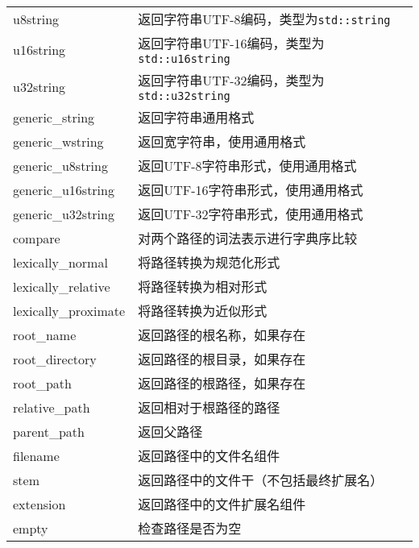 \begin{longtable}{LL}
	u8string                   & 返回字符串UTF-8编码，类型为\texttt{std::string}     \\
	u16string                  & 返回字符串UTF-16编码，类型为\texttt{std::u16string} \\
	u32string                  & 返回字符串UTF-32编码，类型为\texttt{std::u32string} \\
	generic\_string            & 返回字符串通用格式                                  \\
	generic\_wstring           & 返回宽字符串，使用通用格式                          \\
	generic\_u8string          & 返回UTF-8字符串形式，使用通用格式                   \\
	generic\_u16string         & 返回UTF-16字符串形式，使用通用格式                  \\
	generic\_u32string         & 返回UTF-32字符串形式，使用通用格式                  \\
	compare                    & 对两个路径的词法表示进行字典序比较                  \\
	lexically\_normal          & 将路径转换为规范化形式                              \\
	lexically\_relative        & 将路径转换为相对形式                                \\
	lexically\_proximate       & 将路径转换为近似形式                                \\
	root\_name                 & 返回路径的根名称，如果存在                          \\
	root\_directory            & 返回路径的根目录，如果存在                          \\
	root\_path                 & 返回路径的根路径，如果存在                          \\
	relative\_path             & 返回相对于根路径的路径                              \\
	parent\_path               & 返回父路径                                          \\
	filename                   & 返回路径中的文件名组件                              \\
	stem                       & 返回路径中的文件干（不包括最终扩展名）              \\
	extension                  & 返回路径中的文件扩展名组件                          \\
	empty                      & 检查路径是否为空                                    \\

\end{longtable}
